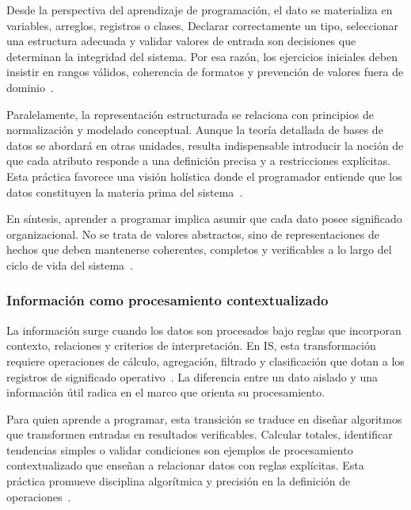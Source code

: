 \documentclass[12pt,twoside]{book}
\begin{document}
						Desde la perspectiva del aprendizaje de programación, el dato se materializa en variables, arreglos, registros o clases. Declarar correctamente un tipo, seleccionar una estructura adecuada y validar valores de entrada son decisiones que determinan la integridad del sistema. Por esa razón, los ejercicios iniciales deben insistir en rangos válidos, coherencia de formatos y prevención de valores fuera de dominio~\cite{Gaddis2022Starting,Hanly2015Problem,ISO247722024Programming}.
						
						Paralelamente, la representación estructurada se relaciona con principios de normalización y modelado conceptual. Aunque la teoría detallada de bases de datos se abordará en otras unidades, resulta indispensable introducir la noción de que cada atributo responde a una definición precisa y a restricciones explícitas. Esta práctica favorece una visión holística donde el programador entiende que los datos constituyen la materia prima del sistema~\cite{Elmasri2016Database,Silberschatz2020Database,Date2019Database}.
						
						En síntesis, aprender a programar implica asumir que cada dato posee significado organizacional. No se trata de valores abstractos, sino de representaciones de hechos que deben mantenerse coherentes, completos y verificables a lo largo del ciclo de vida del sistema~\cite{Laudon2020Management,Ghezzi2003Fundamentals,Bernstein2009Data}.
						
					\subsubsection{Información como procesamiento contextualizado}
						\noindent
						La información surge cuando los datos son procesados bajo reglas que incorporan contexto, relaciones y criterios de interpretación. En IS, esta transformación requiere operaciones de cálculo, agregación, filtrado y clasificación que dotan a los registros de significado operativo~\cite{Laudon2020Management,Bernstein2009Data,Calzati2025Ecosystemic}. La diferencia entre un dato aislado y una información útil radica en el marco que orienta su procesamiento.
						
						Para quien aprende a programar, esta transición se traduce en diseñar algoritmos que transformen entradas en resultados verificables. Calcular totales, identificar tendencias simples o validar condiciones son ejemplos de procesamiento contextualizado que enseñan a relacionar datos con reglas explícitas. Esta práctica promueve disciplina algorítmica y precisión en la definición de operaciones~\cite{Wirth1976Algorithms,Hanly2015Problem,Gaddis2022Starting}.
						
\end{document}
